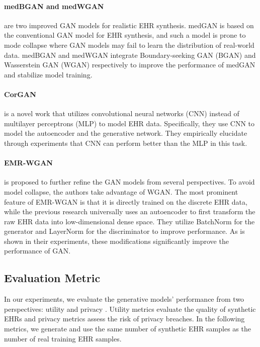 \paragraph{medBGAN and medWGAN} \citep{medbgan} are two improved GAN models for realistic EHR synthesis. medGAN is based on the conventional GAN model for EHR synthesis, and such a model is prone to mode collapse where GAN models may fail to learn the distribution of real-world data. medBGAN and medWGAN integrate Boundary-seeking GAN (BGAN) \citep{devon2018boundary} and Wasserstein GAN (WGAN) \citep{wgan} respectively to improve the performance of medGAN and stabilize model training.

\paragraph{CorGAN}\citep{torfi2020corgan} is a novel work that utilizes convolutional neural networks (CNN) instead of multilayer perceptrons (MLP) to model EHR data. 
Specifically, they use CNN to model the autoencoder and the generative network. They empirically elucidate through experiments that CNN can perform better than the MLP in this task.

\paragraph{EMR-WGAN}\citep{zhang2020ensuring} is proposed to further refine the GAN models from several perspectives. To avoid model collapse, the authors take advantage of WGAN. The most prominent feature of EMR-WGAN is that it is directly trained on the discrete EHR data, while the previous research universally uses an autoencoder to first transform the raw EHR data into low-dimensional dense space. 
They utilize BatchNorm \citep{batchnorm} for the generator and LayerNorm \citep{layernorm} for the discriminator to improve performance.
As is shown in their experiments, these modifications significantly improve the performance of GAN.

\subsection{Evaluation Metric}
In our experiments, we evaluate the generative models' performance from two perspectives: utility and privacy \citep{Yan2022AMB}. Utility metrics evaluate the quality of synthetic EHRs and privacy metrics assess the risk of privacy breaches. In the following metrics, we generate and use the same number of synthetic EHR samples as the number of real training EHR samples. 

